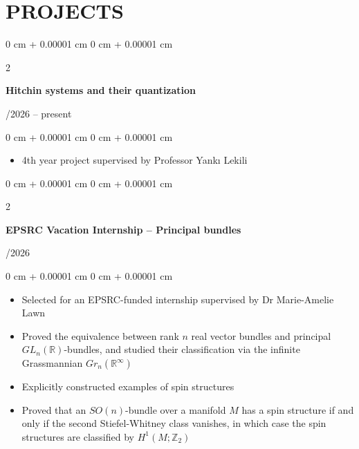 \documentclass[10pt, letterpaper]{article}
\newenvironment{highlights}{
    \begin{itemize}[
        topsep=0.10 cm,
        parsep=0.10 cm,
        partopsep=0pt,
        itemsep=0pt,
        leftmargin=0 cm + 10pt
    ]
}{
    \end{itemize}
}
\newenvironment{onecolentry}{
    \begin{adjustwidth}{
        0 cm + 0.00001 cm
    }{
        0 cm + 0.00001 cm
    }
}{
    \end{adjustwidth}
}
\newenvironment{twocolentry}[2][]{
    \onecolentry
    \def\secondColumn{#2}
    \setcolumnwidth{\fill, 4.5 cm}
    \begin{paracol}{2}
}{
    \switchcolumn \raggedleft \secondColumn
    \end{paracol}
    \endonecolentry
} %
\begin{document}
    
    \section{PROJECTS}

        \begin{twocolentry}{
            10/2026 -- present
        }
            \textbf{Hitchin systems and their quantization}
        \end{twocolentry}

        \vspace{0.10 cm}
        \begin{onecolentry}
            \begin{highlights}
                \item 4th year project supervised by Professor Yankı Lekili
            \end{highlights}
        \end{onecolentry}

        \vspace{0.2 cm}


        \begin{twocolentry}{
            09/2026
        }
            \textbf{EPSRC Vacation Internship -- Principal bundles}
        \end{twocolentry}

        \vspace{0.10 cm}
        \begin{onecolentry}
            \begin{highlights}
                \item Selected for an EPSRC-funded internship supervised by Dr Marie-Amelie Lawn
                \item Proved the equivalence between rank \(n\) real vector bundles and principal \(GL_n(\mathbb{R})\)-bundles, and studied their classification via the infinite Grassmannian \(Gr_n(\mathbb{R}^\infty)\)
                \item Explicitly constructed examples of spin structures
                \item Proved that an \(SO(n)\)-bundle over a manifold \(M\) has a spin structure if and only if the second Stiefel-Whitney class vanishes, in which case the spin structures are classified by \(H^1(M; \mathbb{Z}_2)\)
            \end{highlights}
        \end{onecolentry}

        \vspace{0.2 cm}
\end{document}

